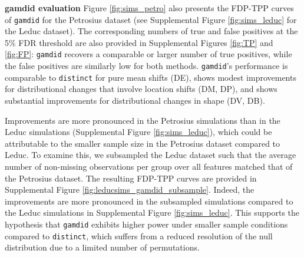 \textbf{gamdid evaluation}
Figure \ref{fig:sims_petro} also presents the FDP-TPP curves of \texttt{gamdid} for the Petrosius dataset (see Supplemental Figure \ref{fig:sims_leduc} for the Leduc dataset). The corresponding numbers of true and false positives at the 5\% FDR threshold are also provided in Supplemental Figures \ref{fig:TP} and \ref{fig:FP}: \texttt{gamdid} recovers a comparable or larger number of true positives, while the false positives are similarly low for both methods.
\texttt{gamdid}'s performance is comparable to \texttt{distinct} for pure mean shifts (DE), shows modest improvements for distributional changes that involve location shifts (DM, DP), and shows substantial improvements for distributional changes in shape (DV, DB).

Improvements are more pronounced in the Petrosius simulations than in the Leduc simulations (Supplemental Figure \ref{fig:sims_leduc}), which could be attributable to the smaller sample size in the Petrosius dataset compared to Leduc.
To examine this, we subsampled the Leduc dataset such that the average number of non-missing observations per group over all features matched that of the Petrosius dataset. The resulting FDP-TPP curves are provided in Supplemental Figure \ref{fig:leducsims_gamdid_subsample}. Indeed, the improvements are more pronounced in the subsampled simulations compared to the Leduc simulations in Supplemental Figure \ref{fig:sims_leduc}. This supports the hypothesis that \texttt{gamdid} exhibits higher power under smaller sample conditions compared to \texttt{distinct}, which suffers from a reduced resolution of the null distribution due to a limited number of permutations.





